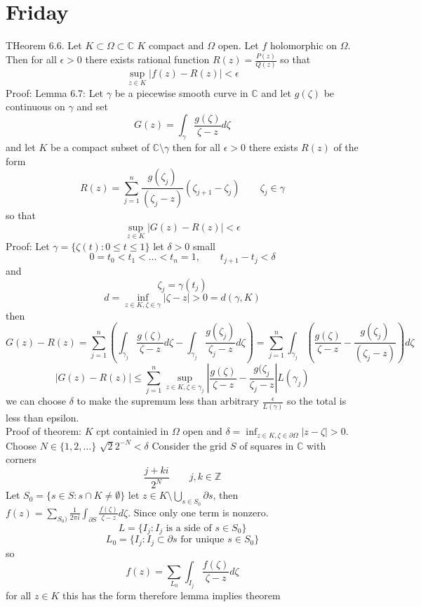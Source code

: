 \documentclass[11pt]{article}
\begin{document}
\section{Friday}
THeorem 6.6.
Let $K \subset \Omega \subset \mathbb{C}$ $K$ compact and  $\Omega$ open. Let $f$ holomorphic on $\Omega$. Then
for all  $\epsilon > 0$ there exists rational function $R(z) = \frac{P(z)}{Q(z)}$ so that
\[
    \sup_{z \in K} |f(z) - R(z)| < \epsilon
\] 
Proof:
Lemma 6.7: Let $\gamma$ be a piecewise smooth curve in $ \mathbb{C}$ and let $g(\zeta)$ be continuous on  $\gamma$ and set
\[
G(z) = \int_{\gamma}^{}\frac{g(\zeta)}{\zeta-z}d \zeta
\] 
and let $K$ be a compact subset of $ \mathbb{C} \setminus \gamma$ then for all $\epsilon > 0$ there exists $ R(z)$ of the form
 \[
     R(z) = \sum_{j=1}^{n}\frac{g(\zeta_j)}{(\zeta_j -z)}(\zeta_{j+1}-\zeta_j) \qquad \zeta_j \in \gamma
\] 
so that
\[
    \sup_{z \in K} |G(z) - R(z)| < \epsilon
\] 
Proof: Let $\gamma = \{\zeta(t) : 0 \le t \le 1\}$ let $\delta > 0$ small
\[
    0 = t_0 < t_1 < \dots < t_n = 1, \qquad t_{j+1} - t_j < \delta
\] 
and
\[
\zeta_j = \gamma(t_j)
\] 
\[
    d = \inf_{z \in K, \zeta \in \gamma} |\zeta - z| > 0 = d(\gamma,K)
\] 
then
\[
G(z) - R(z) = \sum_{j=1}^{n}\left(\int_{\gamma_j}^{}\frac{g(\zeta)}{\zeta-z}d\zeta - \int_{\gamma_j}^{}\frac{g(\zeta_j)}{\zeta_j-z}d\zeta\right) = \sum_{j=1}^{n} \int_{\gamma_j}^{}\left(\frac{g(\zeta)}{\zeta-z} - \frac{g(\zeta_j)}{(\zeta_j-z)}\right)d\zeta
\] 
\[
    |G(z) - R(z)| \le \sum_{j=1}^{n}\sup_{z \in K, \zeta \in \gamma_j} \left|\frac{g(\zeta)}{\zeta-z} - \frac{g(\zeta_j}{\zeta_j - z}\right| L(\gamma_j)
\] 
we can choose $\delta$ to make the supremum less than arbitrary $\frac{\epsilon}{L(\gamma)}$ so the total is less than epsilon.\\
Proof of theorem: $K$ cpt containied in $\Omega$ open and  $\delta = \inf_{z \in K, \zeta \in \partial \Omega} |z - \zeta| > 0$.
Choose $N \in \{1,2,\dots\}$  $\sqrt{2}2^{-N} < \delta$ Consider the grid $S$ of squares in  $ \mathbb{C}$ with corners
\[
\frac{j+ki}{2^{N}} \qquad j,k \in \mathbb{Z}
\] 
Let $S_0 = \{s \in S: s \cap K \ne \emptyset\}$ let $z \in K \setminus \bigcup_{s \in S_0}\partial s$, then $f(z) = \sum_{S_0)}^{}\frac{1}{2\pi i} \int_{\partial S}^{} \frac{f(\zeta)}{\zeta - z} d \zeta$. Since only one term is nonzero.
\[
    L = \{I_j : I_j \text{ is a side of $s \in S_0$}\}
\] 
\[
    L_0 = \{I_j : I_j \subset \partial s \text{ for unique $s \in S_0$}\}
\] 
so
\[
f(z) = \sum_{L_0}^{}\int_{I_j}^{} \frac{f(\zeta)}{\zeta - z} d\zeta
\] 
for all $z \in K$ this has the form therefore lemma implies theorem
\end{document}
